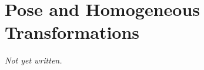 \section{Pose and Homogeneous Transformations}\label{sec:pl:pose-homogeneous}

\emph{Not yet written.}
